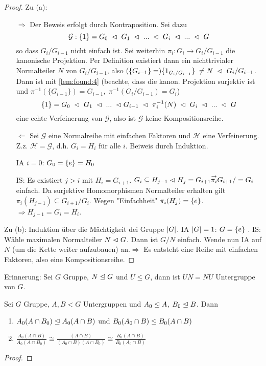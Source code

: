 \documentclass[../main.tex]{subfiles}
\begin{document}
\begin{proof}
    Zu (a): 
    \begin{itemize}
        \item[$\Rightarrow$] Der Beweis erfolgt durch Kontraposition. Sei dazu $$\mathcal{G}: \{1\} = G_0 \; \vartriangleleft \; G_1 \; \vartriangleleft \; ... \; \vartriangleleft \; G_i \; \vartriangleleft \; ... \; \vartriangleleft \; G$$ so dass $G_i/G_{i-1}$ nicht einfach ist. Sei weiterhin $\pi_i: G_i \rightarrow G_i/G_{i-1}$ die kanonische Projektion. Per Definition existiert dann ein nichttrivialer Normalteiler $N$ von $G_i/G_{i-1}$, also $(\{G_{i-1}\} =) \{1_{G_i/G_{i-1}}\} \; \neq N \; \vartriangleleft \; G_i/G_{i-1}$. Dann ist mit \cref{lem:found:4} (beachte, dass die kanon. Projektion surjektiv ist und $\pi^{-1}(\{G_{i-1}\}) = G_{i-1}, \; \pi^{-1}(G_i/G_{i-1}) = G_i$) $$\{1\} = G_0 \; \vartriangleleft \; G_1 \; \vartriangleleft \; ... \; \vartriangleleft G_{i-1} \; \vartriangleleft \; \pi_i^{-1}(N) \; \vartriangleleft \; G_i \; \vartriangleleft \; ... \; \vartriangleleft \; G$$ eine echte Verfeinerung von $\mathcal{G}$, also ist $\mathcal{G}$ keine Kompositionsreihe.
        \item[$\Leftarrow$] Sei $\mathcal{G}$ eine Normalreihe mit einfachen Faktoren und $\mathcal{H}$ eine Verfeinerung. Z.z. $\mathcal{H} = \mathcal{G}$, d.h. $G_i = H_i$ für alle $i$. Beiweis durch Induktion.

        IA  $i=0$: $G_0=\{e\}=H_0$ \checkmark

        IS: Es existiert $j>i$ mit $H_i = G_{i+1}$. $G_i \subseteq H_{j-1}\vartriangleleft H_j = G_{i+1} \overset{\rightarrow}{\pi_i} G_{i+1}/=G_i$ einfach. Da surjektive Homomorphismen Normalteiler erhalten gilt $\pi_i(H_{j-1})\subseteq G_{i+1}/G_i$. Wegen "Einfachheit" $\pi_i(H_j)=\{e\}$. $\Rightarrow H_{j-1} = G_i = H_i$.
    \end{itemize}
    Zu (b):
    Induktion über die Mächtigkeit dei Gruppe $\left\vert G \right\vert$. IA $\left\vert G \right\vert=1$: $G=\{e\}$ \checkmark.
    IS: Wähle maximalen Normalteiler $N\vartriangleleft G$. Dann ist $G/N$ einfach. Wende nun IA auf $N$ (um die Kette weiter aufzubauen) an.$\Rightarrow$ Es entsteht eine Reihe mit einfachen Faktoren, also eine Kompositionsreihe.
\end{proof}

Erinnerung: Sei $G$ Gruppe, $N \trianglelefteq G$ und $U\leq G$, dann ist $UN=NU$ Untergruppe von $G$. 
\begin{lemma}
Sei $G$ Gruppe, $A,B <G$ Untergruppen und $A_0 \trianglelefteq A$, $B_0 \trianglelefteq B$. Dann
\begin{enumerate}[label=(\alph*)]
        \item $A_0(A\cap B_0)\trianglelefteq A_0(A\cap B)$ und $B_0(A_0 \cap B) \trianglelefteq B_0(A\cap B)$
        \item $\frac{A_0(A\cap B)}{A_0(A\cap B_0)}\cong\frac{(A\cap B)}{(A_0\cap B)(A\cap B_0)}\cong \frac{B_0(A\cap B)}{B_0(A_0\cap B)}$
    \end{enumerate}
\end{lemma}
\begin{proof}
    \TODO
\end{proof}
\end{document}
